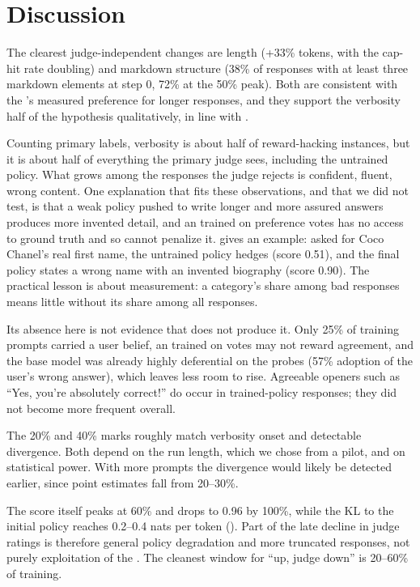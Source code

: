 \section{Discussion}
\label{sec:discussion}

The clearest judge-independent changes are length (+33\% tokens, with the cap-hit rate doubling) and markdown structure (38\% of responses with at least three markdown elements at step 0, 72\% at the 50\% peak).
Both are consistent with the \rmodel's measured preference for longer responses, and they support the verbosity half of the hypothesis qualitatively, in line with \citet{singhal2023long}.

Counting primary labels, verbosity is about half of reward-hacking instances, but it is about half of everything the primary judge sees, including the untrained policy.
What grows among the responses the judge rejects is confident, fluent, wrong content.
One explanation that fits these observations, and that we did not test, is that a weak policy pushed to write longer and more assured answers produces more invented detail, and an \rmodel trained on preference votes has no access to ground truth and so cannot penalize it.
 gives an example: asked for Coco Chanel's real first name, the untrained policy hedges (\rmodel score 0.51), and the final policy states a wrong name with an invented biography (\rmodel score 0.90).
The practical lesson is about measurement: a category's share among bad responses means little without its share among all responses.

Its absence here is not evidence that \rlhf does not produce it.
Only 25\% of training prompts carried a user belief, an \rmodel trained on \arena votes may not reward agreement, and the base model was already highly deferential on the probes (57\% adoption of the user's wrong answer), which leaves less room to rise.
Agreeable openers such as ``Yes, you're absolutely correct!'' do occur in trained-policy responses; they did not become more frequent overall.

The 20\% and 40\% marks roughly match verbosity onset and detectable divergence.
Both depend on the run length, which we chose from a pilot, and on statistical power.
With more prompts the divergence would likely be detected earlier, since point estimates fall from 20--30\%.

The \rmodel score itself peaks at 60\% and drops to 0.96 by 100\%, while the KL to the initial policy reaches 0.2--0.4 nats per token ().
Part of the late decline in judge ratings is therefore general policy degradation and more truncated responses, not purely exploitation of the \rmodel.
The cleanest window for ``\rmodel up, judge down'' is 20--60\% of training.

